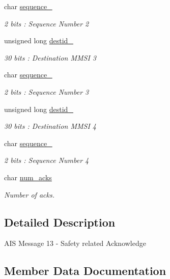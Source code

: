 \begin{DoxyCompactItemize}
char \mbox{\hyperlink{structaismsg__13_add43c1c4814c4a751c2b51c747e12422}{sequence\+\_}}
\begin{DoxyCompactList}\small\item\em 2 bits \+: Sequence Number 2 \end{DoxyCompactList}\item 
unsigned long \mbox{\hyperlink{structaismsg__13_a52f67c3beec205c4c82cbfbad2c5d8ec}{destid\+\_}}
\begin{DoxyCompactList}\small\item\em 30 bits \+: Destination M\+M\+SI 3 \end{DoxyCompactList}\item 
char \mbox{\hyperlink{structaismsg__13_a904a4b74c332ff33bc9b36486e291ccb}{sequence\+\_}}
\begin{DoxyCompactList}\small\item\em 2 bits \+: Sequence Number 3 \end{DoxyCompactList}\item 
unsigned long \mbox{\hyperlink{structaismsg__13_a5738dbbc2ec05e957aa94fca7856b261}{destid\+\_}}
\begin{DoxyCompactList}\small\item\em 30 bits \+: Destination M\+M\+SI 4 \end{DoxyCompactList}\item 
char \mbox{\hyperlink{structaismsg__13_aee93ef8f1ca5ed72ffabf2727bfde14f}{sequence\+\_}}
\begin{DoxyCompactList}\small\item\em 2 bits \+: Sequence Number 4 \end{DoxyCompactList}\item 
char \mbox{\hyperlink{structaismsg__13_ac45c61e81441ce785600fc0584c9e079}{num\+\_\+acks}}
\begin{DoxyCompactList}\small\item\em Number of acks. \end{DoxyCompactList}\end{DoxyCompactItemize}


\subsection{Detailed Description}
A\+IS Message 13 -\/ Safety related Acknowledge 

\subsection{Member Data Documentation}
\mbox{\label{structaismsg__13_a06cb425d1249a04dc565fb5e3b61be33}} 
